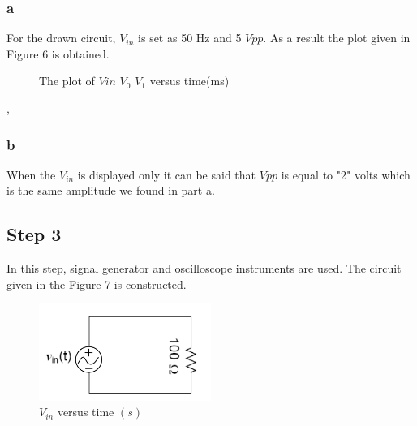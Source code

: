 \documentclass[letterpaper,12pt]{article}
\begin{document}
\subsubsection{a}
For the drawn circuit, \(V_{in}\) is set as 50 Hz and 5 \(V{pp}\). As a result the plot given in Figure 6 is obtained.
\begin{figure}[H] 
	\caption{The plot of \(V{in}\) \(V_0\) \(V_1\) versus time(ms) }
\end{figure},

\subsubsection{b}
When the \(V_{in}\)  is displayed only it can be said that \(V{pp}\) is equal to "2" volts which is the same amplitude we found in part a. 


\subsection{Step 3}
In this step, signal generator and oscilloscope instruments are used. The circuit given in the Figure 7 is constructed.
\begin{figure}[H]
	\centering
   \includegraphics[width=0.5\textwidth]{3_sch.png}
   \caption{\(V_{in}\) versus time \((s)\) }
\end{figure}  
\end{document}
